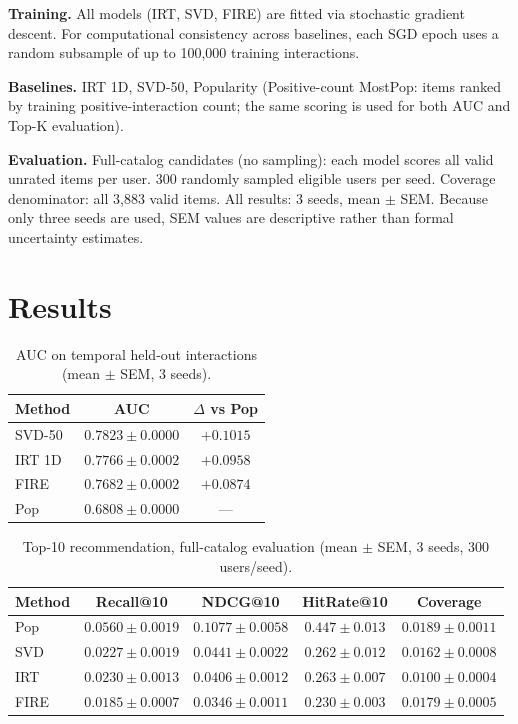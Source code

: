 \documentclass[11pt,a4paper]{article}
\begin{document}
\textbf{Training.} All models (IRT, SVD, FIRE) are fitted via stochastic gradient descent. For computational consistency across baselines, each SGD epoch uses a random subsample of up to 100,000 training interactions.

\textbf{Baselines.} IRT 1D, SVD-50, Popularity (Positive-count MostPop: items ranked by training positive-interaction count; the same scoring is used for both AUC and Top-K evaluation).

\textbf{Evaluation.} Full-catalog candidates (no sampling): each model scores all valid unrated items per user. 300 randomly sampled eligible users per seed. Coverage denominator: all 3,883 valid items. All results: 3 seeds, mean $\pm$ SEM. Because only three seeds are used, SEM values are descriptive rather than formal uncertainty estimates.

\section{Results}

\begin{table}[h]
\centering
\caption{AUC on temporal held-out interactions (mean $\pm$ SEM, 3 seeds).}
\label{tab:auc}
\begin{tabular}{lcc}
\toprule
Method & AUC & $\Delta$ vs Pop \\
\midrule
SVD-50 & $\mathbf{0.7823 \pm 0.0000}$ & $+0.1015$ \\
IRT 1D & $0.7766 \pm 0.0002$ & $+0.0958$ \\
FIRE & $0.7682 \pm 0.0002$ & $+0.0874$ \\
Pop & $0.6808 \pm 0.0000$ & --- \\
\bottomrule
\end{tabular}
\end{table}

\begin{table}[h]
\centering
\caption{Top-10 recommendation, full-catalog evaluation (mean $\pm$ SEM, 3 seeds, 300 users/seed).}
\label{tab:topk}
\begin{tabular}{lcccc}
\toprule
Method & Recall@10 & NDCG@10 & HitRate@10 & Coverage \\
\midrule
Pop & $0.0560 \pm 0.0019$ & $0.1077 \pm 0.0058$ & $0.447 \pm 0.013$ & $0.0189 \pm 0.0011$ \\
SVD & $0.0227 \pm 0.0019$ & $0.0441 \pm 0.0022$ & $0.262 \pm 0.012$ & $0.0162 \pm 0.0008$ \\
IRT & $0.0230 \pm 0.0013$ & $0.0406 \pm 0.0012$ & $0.263 \pm 0.007$ & $0.0100 \pm 0.0004$ \\
FIRE & $0.0185 \pm 0.0007$ & $0.0346 \pm 0.0011$ & $0.230 \pm 0.003$ & $0.0179 \pm 0.0005$ \\
\bottomrule
\end{tabular}
\end{table}
\end{document}
